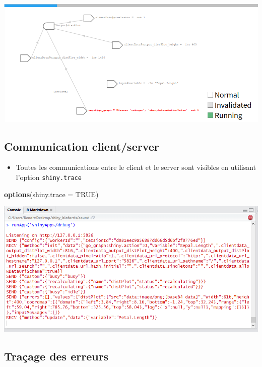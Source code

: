 \documentclass[
]{article}
\newenvironment{Shaded}{\begin{snugshade}}{\end{snugshade}}
\newcommand{\AttributeTok}[1]{\textcolor[rgb]{0.13,0.29,0.53}{#1}}
\newcommand{\ConstantTok}[1]{\textcolor[rgb]{0.56,0.35,0.01}{#1}}
\newcommand{\FunctionTok}[1]{\textcolor[rgb]{0.13,0.29,0.53}{\textbf{#1}}}
\newcommand{\NormalTok}[1]{#1}
\providecommand{\tightlist}{%
  \setlength{\itemsep}{0pt}\setlength{\parskip}{0pt}}
\begin{document}
\includegraphics{img/debug_log.png}

\hypertarget{communication-clientserver}{%
\subsection{Communication
client/server}\label{communication-clientserver}}

\begin{itemize}
\tightlist
\item
  Toutes les communications entre le client et le server sont visibles
  en utilisant l'option \texttt{shiny.trace}
\end{itemize}

\begin{Shaded}
\begin{Highlighting}[]
\FunctionTok{options}\NormalTok{(}\AttributeTok{shiny.trace =} \ConstantTok{TRUE}\NormalTok{) }
\end{Highlighting}
\end{Shaded}

\includegraphics{img/debug_trace.png}

\hypertarget{trauxe7age-des-erreurs}{%
\subsection{Traçage des erreurs}\label{trauxe7age-des-erreurs}}
\end{document}
